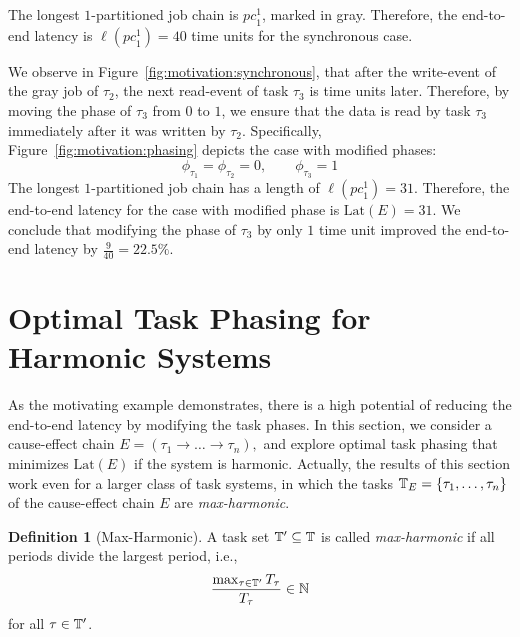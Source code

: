\documentclass[10pt,conference]{resources/IEEEtran}
\theoremstyle{definition}
\newtheorem{definition}[theorem]{Definition}
\newcommand{\lat}{\mathrm{Lat}}
\newcommand{\pc}{{pc}}
\begin{document}
	The longest $1$-partitioned job chain is $\pc^1_1$, marked in gray. 
	Therefore, the end-to-end latency is $\ell(\pc^1_1) = 40$ time units for the synchronous case.
	
	We observe in Figure~\ref{fig:motivation:synchronous}, that after the write-event of the gray job of $\tau_2$, the next read-event of task $\tau_3$ is time units later. 
	Therefore, by moving the phase of $\tau_3$ from $0$ to $1$, we ensure that the data is read by task $\tau_3$ immediately after it was written by $\tau_2$.
	Specifically, Figure~\ref{fig:motivation:phasing} depicts the case with modified phases:
	\begin{equation}
		\phi_{\tau_1} = \phi_{\tau_2} = 0 , \qquad  \phi_{\tau_3} = 1
	\end{equation} 
	The longest $1$-partitioned job chain has a length of $\ell(\pc^1_1) = 31$.
	Therefore, the end-to-end latency for the case with modified phase is $\lat(E) = 31$.
	We conclude that modifying the phase of $\tau_3$ by only $1$ time unit improved the end-to-end latency by $\frac{9}{40} = 22.5\%$.



\section{Optimal Task Phasing for Harmonic Systems}
\label{sec:harmonic}
	
	As the motivating example demonstrates, there is a high potential of reducing the end-to-end latency by modifying the task phases. 
	In this section, we
	consider a cause-effect chain 
	\begin{math}
		E = (\tau_1 \to\dots\to \tau_n),
	\end{math}
	and
	explore optimal task phasing 
	that minimizes $\lat(E)$ if the system is harmonic.
	Actually, the results of this section work even for a larger class of task systems, in which the tasks 
	\begin{math}
		\mathbb{T}_E = \left\{{\tau_1, \dots, \tau_n}\right\}
	\end{math}
	of the cause-effect chain $E$ are \emph{max-harmonic}. 
	
	\begin{definition}[Max-Harmonic]
		A task set $\mathbb{T}' \subseteq \mathbb{T}$ is called \emph{max-harmonic} if all periods divide the largest period, i.e., 
		\begin{equation}
			\frac{\max_{\tau\in \mathbb{T}'} T_{\tau}}{T_{\tau}} \in \mathbb{N}
		\end{equation}
		for all $\tau \in \mathbb{T}'$.
	\end{definition}
\end{document}
